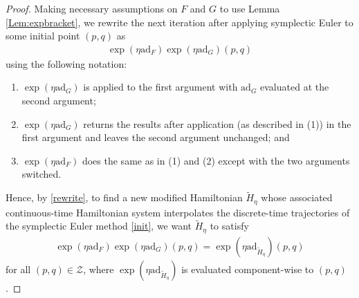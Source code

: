 \documentclass[11pt]{article}
\newcommand{\Z}{\mathcal{Z}}
\newcommand{\ad}{\mathrm{ad}}
\begin{document}
\begin{proof}
Making necessary assumptions on $F$ and $G$ to use Lemma \ref{Lem:expbracket}, we rewrite the next iteration after applying symplectic Euler to some initial point $\left(p,q\right)$ as 
\begin{gather}
    \exp\left(\eta \ad_{F}\right)\exp\left(\eta \ad_{G}\right)\left(p,q\right)\label{rewrite}
\end{gather}
using the following notation:
\begin{enumerate}[label={(\arabic*)}]
    \item $\exp\left(\eta \ad_{G}\right)$ is applied to the first argument with $\ad_{G}$ evaluated at the second argument;
    \item $\exp\left(\eta \ad_{G}\right)$ returns the results after application (as described in (1)) in the first argument and leaves the second argument unchanged; and
    \item $\exp\left(\eta \ad_{F}\right)$ does the same as in (1) and (2) except with the two arguments switched.
\end{enumerate}
Hence, by \eqref{rewrite}, to find a new modified Hamiltonian $\widetilde{H}_{\eta}$ whose associated continuous-time Hamiltonian system interpolates the discrete-time trajectories of the symplectic Euler method \eqref{init}, we want $\widetilde{H}_{\eta}$ to satisfy \begin{gather}
    \exp\left(\eta \ad_{F}\right)\exp\left(\eta \ad_{G}\right)\left(p,q\right)=\exp\left(\eta \ad_{\widetilde{H}_{\eta}}\right)\left(p,q\right)\label{adjoint}
\end{gather}
for all $(p,q)\in \Z$, where $\exp\left(\eta \ad_{\widetilde{H}_{\eta}}\right)$ is evaluated component-wise to $\left(p,q\right)$.


\end{proof}
\end{document}
